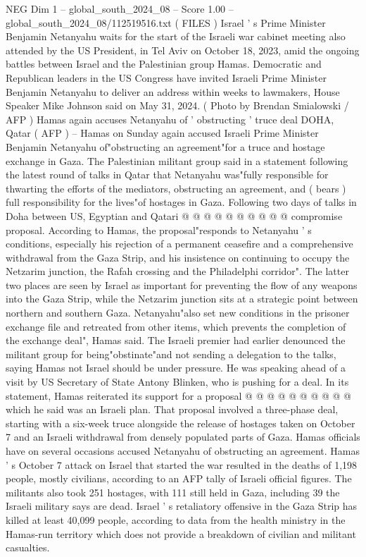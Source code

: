 \begin{textsample}{NEG Dim 1 – global\_south\_2024\_08 – Score 1.00 – global\_south\_2024\_08/112519516.txt}  \label{ex:f1_neg_445}
( FILES ) Israel ' s Prime Minister Benjamin Netanyahu waits for the start of the Israeli war cabinet meeting also attended by the US President, in Tel Aviv on October 18, 2023, amid the ongoing battles between Israel and the Palestinian group Hamas.
Democratic and Republican leaders in the US Congress have invited Israeli Prime Minister Benjamin Netanyahu to deliver an address within weeks to lawmakers, House Speaker Mike Johnson said on May 31, 2024. ( Photo by Brendan Smialowski / AFP ) Hamas again accuses Netanyahu of ' obstructing ' truce deal DOHA, Qatar ( AFP ) -- Hamas on Sunday again accused Israeli Prime Minister Benjamin Netanyahu of"obstructing an agreement"for a truce and hostage exchange in Gaza.
The Palestinian militant group said in a statement following the latest round of talks in Qatar that Netanyahu was"fully responsible for thwarting the efforts of the mediators, obstructing an agreement, and ( bears ) full responsibility for the lives"of hostages in Gaza.
Following two days of talks in Doha between US, Egyptian and Qatari @ @ @ @ @ @ @ @ @ @ compromise proposal.
According to Hamas, the proposal"responds to Netanyahu ' s conditions, especially his rejection of a permanent ceasefire and a comprehensive withdrawal from the Gaza Strip, and his insistence on continuing to occupy the Netzarim junction, the Rafah crossing and the Philadelphi corridor".
The latter two places are seen by Israel as important for preventing the flow of any weapons into the Gaza Strip, while the Netzarim junction sits at a strategic point between northern and southern Gaza.
Netanyahu"also set new conditions in the prisoner exchange file and retreated from other items, which prevents the completion of the exchange deal", Hamas said.
The Israeli premier had earlier denounced the militant group for being"obstinate"and not sending a delegation to the talks, saying Hamas not Israel should be under pressure.
He was speaking ahead of a visit by US Secretary of State Antony Blinken, who is pushing for a deal.
In its statement, Hamas reiterated its support for a proposal @ @ @ @ @ @ @ @ @ @ which he said was an Israeli plan.
That proposal involved a three-phase deal, starting with a six-week truce alongside the release of hostages taken on October 7 and an Israeli withdrawal from densely populated parts of Gaza.
Hamas officials have on several occasions accused Netanyahu of obstructing an agreement.
Hamas ' s October 7 attack on Israel that started the war resulted in the deaths of 1,198 people, mostly civilians, according to an AFP tally of Israeli official figures.
The militants also took 251 hostages, with 111 still held in Gaza, including 39 the Israeli military says are dead.
Israel ' s retaliatory offensive in the Gaza Strip has killed at least 40,099 people, according to data from the health ministry in the Hamas-run territory which does not provide a breakdown of civilian and militant casualties.

\end{textsample}
